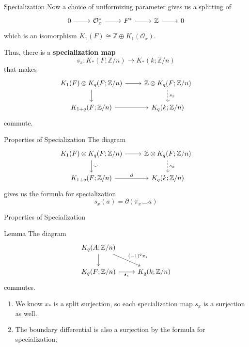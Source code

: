 \documentclass{beamer}
\begin{document}
\begin{frame}[fragile]{Specialization}
Now a choice of uniformizing parameter gives us a splitting of
\[\begin{tikzcd}
0\arrow[r]&\mathcal{O}_x^*\arrow[r]& F^*\arrow[r]&\mathbb{Z}\arrow[r]&0
\end{tikzcd}\]
which is an isomorphism $K_1(F)\cong \mathbb{Z}\oplus K_1(\mathcal{O}_x)$. \pause \vfill

Thus, there is a \textbf{specialization map}
\[s_x: K_*(F; \mathbb{Z}/n)\to K_*(k; \mathbb{Z}/n)\]  
that makes 
\[\begin{tikzcd}
	{K_1(F)\otimes K_q(F; \mathbb{Z}/n)} & {\mathbb{Z}\otimes K_q(F; \mathbb{Z}/n)} \\
	{K_{1+q}(F; \mathbb{Z}/n)} & {K_q(k;\mathbb{Z}/n)}
	\arrow[from=1-1, to=1-2]
	\arrow[from=1-1, to=2-1]
	\arrow["{{s_x}}", dashed, from=1-2, to=2-2]
	\arrow[from=2-1, to=2-2]
\end{tikzcd}\]
commute.


\end{frame}



\begin{frame}[fragile]{Properties of Specialization}
  The diagram 
  \[\begin{tikzcd}
	{K_1(F)\otimes K_q(F; \mathbb{Z}/n)} & {\mathbb{Z}\otimes K_q(F; \mathbb{Z}/n)} \\
	{K_{1+q}(F; \mathbb{Z}/n)} & {K_q(k;\mathbb{Z}/n)}
	\arrow[from=1-1, to=1-2]
	\arrow["{\smile}",from=1-1, to=2-1]
	\arrow["{{s_x}}", dashed, from=1-2, to=2-2]
	\arrow["{\partial}",from=2-1, to=2-2]
\end{tikzcd}\]
gives us the formula for specialization 
\[s_x(a)=\partial(\pi_x\smile a)\]
\end{frame}




\begin{frame}[fragile]{Properties of Specialization}
\begin{block}{Lemma}
  The diagram
\[\begin{tikzcd}
	{K_q(A; \mathbb{Z}/n)} \\
	{K_q(F; \mathbb{Z}/n)} & {K_q(k; \mathbb{Z}/n)}
	\arrow[from=1-1, to=2-1]
	\arrow["{(-1)^qx_*}", from=1-1, to=2-2]
	\arrow["{s_x}"', from=2-1, to=2-2]
\end{tikzcd}\]
  commutes.
\end{block}
\begin{enumerate}
  \item We know $x_*$ is a split surjection, so each specialization map $s_x$ is a surjection as well. \pause
  \item The boundary differential is also a surjection by the formula for specialization; \pause
\end{enumerate}

  
\end{frame}
\end{document}

